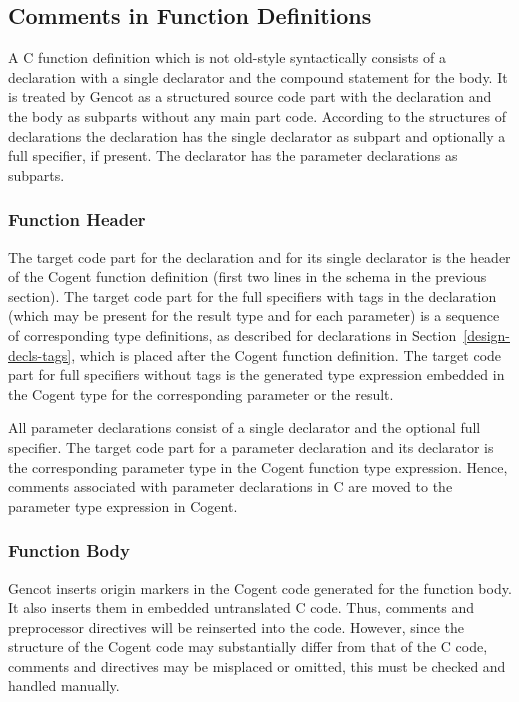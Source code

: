 \subsection{Comments in Function Definitions}
\label{design-fundefs-comments}

A C function definition which is not old-style syntactically consists of a declaration with a single declarator
and the compound statement for the body.
It is treated by Gencot as a structured source code part with the declaration and the body as subparts
without any main part code. According to the structures of declarations the declaration has the single declarator as subpart
and optionally a full specifier, if present. The declarator has the parameter declarations as subparts.

\subsubsection{Function Header}

The target code part for the declaration and for its single declarator is the header of the Cogent function definition
(first two lines in the schema in the previous section). The target code part for the full specifiers with tags in
the declaration (which may be present for the result type and for each parameter) is a sequence of corresponding 
type definitions, as described for declarations in Section~\ref{design-decls-tags}, which is placed 
after the Cogent function definition. The target code part for full specifiers without tags is the generated type
expression embedded in the Cogent type for the corresponding parameter or the result.

All parameter declarations consist of a single declarator and the optional full specifier. The target code part for
a parameter declaration and its declarator is the corresponding parameter type in the Cogent function type expression.
Hence, comments associated with parameter declarations in C are moved to the parameter type expression in Cogent.

\subsubsection{Function Body}

Gencot inserts origin markers in the Cogent code generated for the function body. It also inserts them in embedded 
untranslated C code. Thus, comments and preprocessor directives will be reinserted into the code. However, since the
structure of the Cogent code may substantially differ from that of the C code, comments and directives may be misplaced 
or omitted, this must be checked and handled manually.

